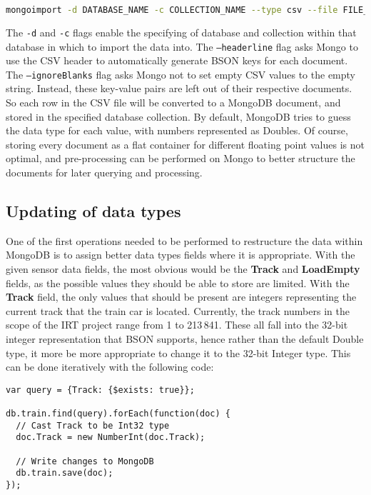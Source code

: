 \documentclass[a4paper,11pt]{article}
\begin{document}
\begin{lstlisting}[language=bash]
mongoimport -d DATABASE_NAME -c COLLECTION_NAME --type csv --file FILE_NAME.csv --headerline --ignoreBlanks
\end{lstlisting}

The \texttt{-d} and \texttt{-c} flags enable the specifying of database and collection within that database in which to
import the data into. The \texttt{--headerline} flag asks Mongo to use the CSV header to automatically generate BSON
keys for each document. The \texttt{--ignoreBlanks} flag asks Mongo not to set empty CSV values to the empty string. Instead,
these key-value pairs are left out of their respective documents.
So each row in the CSV file will be converted to a MongoDB document, and stored in the specified
database collection. By default, MongoDB tries to guess the data type for each value, with numbers represented as Doubles.
Of course, storing every document as a flat container for different floating point values is not optimal, and pre-processing
can be performed on Mongo to better structure the documents for later querying and processing.



\subsection{Updating of data types} %
\label{sub:restructuring_of_data}

One of the first operations needed to be performed to restructure the data within MongoDB is to assign better data types
fields where it is appropriate. With the given sensor data fields, the most obvious would be the \textbf{Track} and
\textbf{LoadEmpty} fields, as the possible values they should be able to store are limited. With the \textbf{Track} field,
the only values that should be present are integers representing the current track that the train car is located. Currently,
the track numbers in the scope of the IRT project range from 1 to 213\,841. These all fall into the 32-bit integer representation
that BSON supports, hence rather than the default Double type, it more be more appropriate to change it to the 32-bit Integer
type. This can be done iteratively with the following code:

\begin{lstlisting}[caption=Performing an iterative operation on database collection ``train''.]
var query = {Track: {$exists: true}};

db.train.find(query).forEach(function(doc) {
  // Cast Track to be Int32 type
  doc.Track = new NumberInt(doc.Track);

  // Write changes to MongoDB
  db.train.save(doc);
});
\end{lstlisting}
\end{document}
